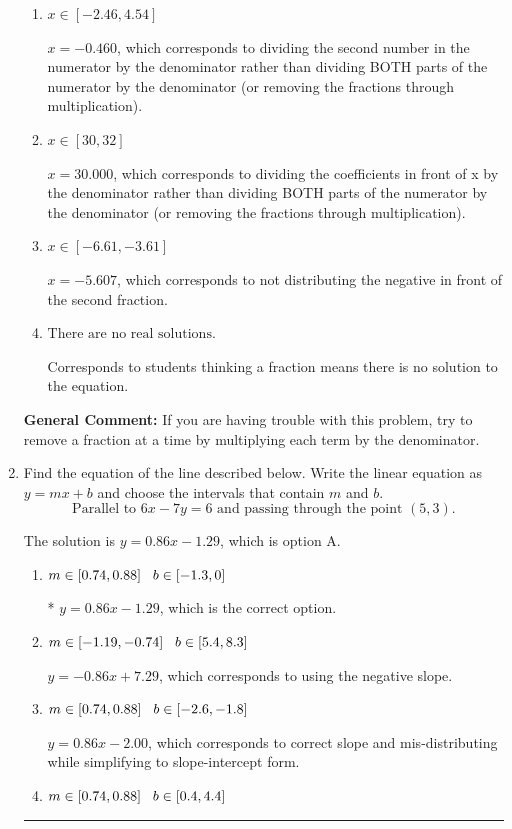 \documentclass{extbook}[14pt]
\newcommand{\litem}[1]{\item #1

\rule{\textwidth}{0.4pt}}
\begin{document}
\begin{enumerate}
{\begin{enumerate}[label=\Alph*.]
* $x = 6.893$, which is the correct option.
\item \( x \in [-2.46, 4.54] \)

 $x = -0.460$, which corresponds to dividing the second number in the numerator by the denominator rather than dividing BOTH parts of the numerator by the denominator (or removing the fractions through multiplication).
\item \( x \in [30, 32] \)

 $x = 30.000$, which corresponds to dividing the coefficients in front of x by the denominator rather than dividing BOTH parts of the numerator by the denominator (or removing the fractions through multiplication).
\item \( x \in [-6.61, -3.61] \)

 $x = -5.607$, which corresponds to not distributing the negative in front of the second fraction.
\item \( \text{There are no real solutions.} \)

Corresponds to students thinking a fraction means there is no solution to the equation.
\end{enumerate}

\textbf{General Comment:} If you are having trouble with this problem, try to remove a fraction at a time by multiplying each term by the denominator.
}
\litem{
Find the equation of the line described below. Write the linear equation as $ y=mx+b $ and choose the intervals that contain $m$ and $b$.
\[ \text{Parallel to } 6 x - 7 y = 6 \text{ and passing through the point } (5, 3). \]

The solution is \( y = 0.86x - 1.29 \), which is option A.\begin{enumerate}[label=\Alph*.]
\item \( m \in [0.74, 0.88] \hspace*{3mm} b \in [-1.3, 0] \)

* $y = 0.86x - 1.29$, which is the correct option.
\item \( m \in [-1.19, -0.74] \hspace*{3mm} b \in [5.4, 8.3] \)

 $y = -0.86x + 7.29$, which corresponds to using the negative slope.
\item \( m \in [0.74, 0.88] \hspace*{3mm} b \in [-2.6, -1.8] \)

 $y = 0.86x - 2.00$, which corresponds to correct slope and mis-distributing while simplifying to slope-intercept form.
\item \( m \in [0.74, 0.88] \hspace*{3mm} b \in [0.4, 4.4] \)


\end{enumerate}}
\end{enumerate}
\end{document}
